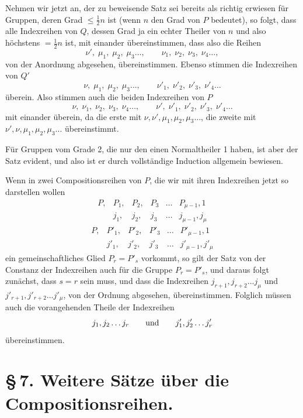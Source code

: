 \documentclass[11pt]{article}
\begin{document}
Nehmen wir jetzt an, der zu beweisende Satz sei bereits als richtig erwiesen für Gruppen, deren Grad $\leq \frac12 n$ ist (wenn $n$ den Grad von $P$ bedeutet), so folgt, dass alle Indexreihen von $Q$, dessen Grad ja ein echter Theiler von $n$ und also höchstens $=\frac12 n$ ist, mit einander übereinstimmen, dass also die Reihen
\[
\nu',\;\mu_1,\;\mu_2,\;\mu_3\ldots,
\qquad
\nu_1,\;\nu_2,\;\nu_3,\;\nu_4\ldots,
\]
von der Anordnung abgesehen, übereinstimmen. Ebenso stimmen die Indexreihen von $Q'$
\[
\nu,\;\mu_1,\;\mu_2,\;\mu_3\ldots,
\qquad
\nu'_1,\;\nu'_2,\;\nu'_3,\;\nu'_4\ldots
\]
überein. Also stimmen auch die beiden Indexreihen von $P$
\[
\nu,\;\nu_1,\;\nu_2,\;\nu_3,\;\nu_4\ldots,
\qquad
\nu',\;\nu'_1,\;\nu'_2,\;\nu'_3,\;\nu'_4\ldots
\]
mit einander überein, da die erste mit $\nu,\nu',\mu_1,\mu_2,\mu_3\ldots$, die zweite mit $\nu',\nu,\mu_1,\mu_2,\mu_3\ldots$ übereinstimmt.

Für Gruppen vom Grade 2, die nur den einen Normaltheiler 1 haben, ist aber der Satz evident, und also ist er durch vollständige Induction allgemein bewiesen.

Wenn in zwei Compositionsreihen von $P$, die wir mit ihren Indexreihen jetzt so darstellen wollen
\begin{equation}
\begin{array}{cccccc}
P,&P_1,&P_2,&P_3&\ldots&P_{\mu-1},1\\
&j_1,&j_2,&j_3&\ldots&j_{\mu-1},j_\mu
\end{array}
\tag{28}
\end{equation}
\begin{equation}
\begin{array}{cccccc}
P,&P'_1,&P'_2,&P'_3&\ldots&P'_{\mu-1},1\\
&j'_1,&j'_2,&j'_3&\ldots&j'_{\mu-1},j'_\mu
\end{array}
\tag{29}
\end{equation}
ein gemeinschaftliches Glied $P_r=P'_s$ vorkommt, so gilt der Satz von der Constanz der Indexreihen auch für die Gruppe $P_r=P'_s$, und daraus folgt zunächst, dass $s=r$ sein muss, und dass die Indexreihen $j_{r+1},j_{r+2}\ldots j_\mu$ und $j'_{r+1},j'_{r+2}\ldots j'_\mu$, von der Ordnung abgesehen, übereinstimmen. Folglich müssen auch die vorangehenden Theile der Indexreihen
\[
j_1,j_2\ldots j_r
\qquad\hbox{und}\qquad
j'_1,j'_2\ldots j'_r
\]
übereinstimmen.

\section*{\S\,7. Weitere Sätze über die Compositionsreihen.}
\end{document}
